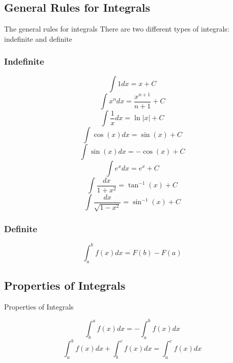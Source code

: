 \documentclass[letterpaper,10pt,twoside,twocolumn,openany]{book}
\begin{document}
\subsection{General Rules for Integrals}
\begin{paperbox}{The general rules for integrals}
    There are two different types of integrals: indefinite and definite
    \subsubsection{Indefinite}
        \begin{equation}
            \int 1 dx = x + C
        \end{equation}
        \begin{equation}
            \int x^n dx = \frac{x^{n+1}}{n+1} + C
        \end{equation}
        \begin{equation}
            \int \frac{1}{x} dx = \ln |x| + C
        \end{equation}
        \begin{equation}
            \int \cos(x) dx = \sin (x) + C
        \end{equation}
        \begin{equation}
            \int \sin(x) dx = -\cos(x) + C
        \end{equation}
        \begin{equation}
            \int e^x dx = e^x + C
        \end{equation}
        \begin{equation}
            \int \frac{dx}{1+x^2} = \tan^{-1}(x) + C
        \end{equation}
        \begin{equation}
            \int \frac{dx}{\sqrt{1-x^2}} = \sin^{-1}(x) + C
        \end{equation}



    \subsubsection{Definite}
        \begin{equation}
            \int_a^b f(x) dx = F(b) - F(a)
        \end{equation}
\end{paperbox}

\subsection{Properties of Integrals}
\begin{paperbox}[]{Properties of Integrals}
    
    \begin{equation}
        \int_b^a f(x)dx = -\int_a^b f(x)dx
    \end{equation}
    \begin{equation}
        \int_a^b f(x) dx + \int_b^c f(x) dx = \int_a^c f(x) dx
    \end{equation}
\end{paperbox}
\end{document}

